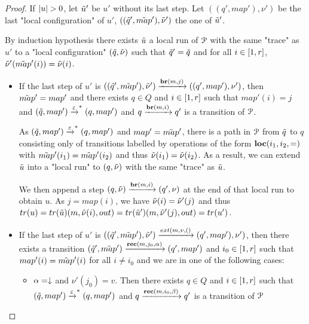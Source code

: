 \begin{proof}
	If $\size{u}>0$, let $\Tilde{u}'$ be $u'$ without its last step. Let $((q', map'), \nu')$ be the last "local configuration" of $u'$, $((\Tilde{q}', \Tilde{map}'), \Tilde{\nu}')$ the one of $\Tilde{u}'$.
	
	By induction hypothesis there exists $\Tilde{u}$ a local run of $\mathcal{P}$ with the same "trace" as $u'$ to a "local configuration" $(\Tilde{q}, \Tilde{\nu})$ such that $\Tilde{q}'=\Tilde{q}$ and for all $i \in [1,r]$, $\Tilde{\nu}'(\Tilde{map}'(i)) = \Tilde{\nu}(i)$.
	
	\begin{itemize}
		\item If the last step of $u'$ is $((\Tilde{q}', \Tilde{map}'), \Tilde{\nu}') \xrightarrow{\textbf{br}(m, j)} ((q', map'), \nu')$, then $\Tilde{map}' = map'$ and there exists $q \in Q$ and $i \in [1,r]$ such that $map'(i)=j$ and $(\Tilde{q}, map') \xrightarrow{\varepsilon}^* (q, map')$ and $q \xrightarrow{\textbf{br}(m, i)} q'$ is a transition of $\mathcal{P}$.
		
		As $(\Tilde{q}, map') \xrightarrow{\varepsilon}^* (q, map')$ and $map'=\Tilde{map}'$, there is a path in $\mathcal{P}$ from $\Tilde{q}$ to $q$ consisting only of transitions labelled by operations of the form $\textbf{loc}(i_1,i_2,{=})$ with $\Tilde{map}'(i_1) = \Tilde{map}'(i_2)$ and thus $\Tilde{\nu}(i_1) = \Tilde{\nu}(i_2)$.
		As a result, we can extend $\Tilde{u}$ into a "local run" to $(q, \Tilde{\nu})$ with the same  "trace" as $\Tilde{u}$.
		
		We then append a step $(q, \Tilde{\nu}) \xrightarrow{\textbf{br}(m, i)} (q', \nu)$ at the end of that local run to obtain $u$. As $j = map(i)$, we have $\Tilde{\nu}(i) = \Tilde{\nu}'(j)$ and thus $\trace{u} = \trace{\Tilde{u}}(m, \Tilde{\nu}(i), out) = \trace{\Tilde{u}'}(m, \Tilde{\nu}'(j), out) = \trace{u'}$.
		
		\item If the last step of $u'$ is $((\Tilde{q}', \Tilde{map}'), \Tilde{\nu}') \extbr{m, v} ((q', map'), \nu')$, then there exists a transition  $(\Tilde{q}', \Tilde{map}') \xrightarrow{\textbf{rec}(m, j_0, \alpha)} (q', map')$ and $i_0 \in [1,r]$ such that $map'(i) = \Tilde{map}'(i)$ for all $i\neq i_0$ and we are in one of the following cases:
		
		\begin{itemize}
			\item $\alpha = \downarrow$ and $\nu'(j_0)=v$. Then there exists $q \in Q$ and $i \in [1,r]$ such that $(\Tilde{q}, map') \xrightarrow{\varepsilon}^* (q, map')$ and $q \xrightarrow{\textbf{rec}(m, i_0, \beta)} q'$ is a transition of $\mathcal{P}$
			

\end{itemize}
\end{itemize}
\end{proof}
